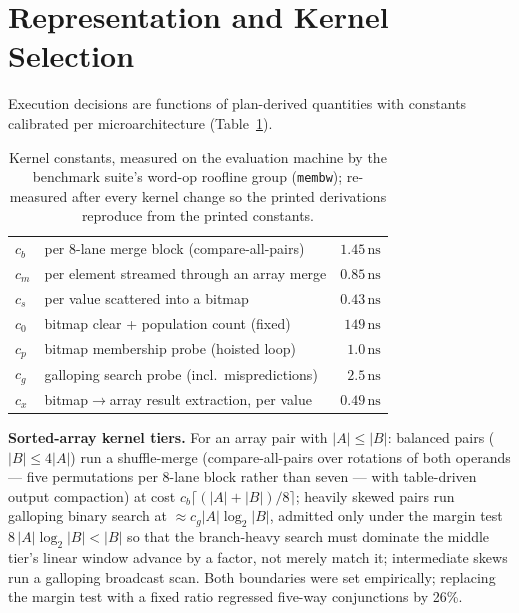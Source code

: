 \documentclass[sigconf,nonacm]{acmart}
\newcommand{\nsu}{\,\text{ns}}
\begin{document}
\section{Representation and Kernel Selection}
\label{sec:dispatch}

Execution decisions are functions of plan-derived quantities with
constants calibrated per microarchitecture (Table~\ref{tab:constants}).

\begin{table}[t]
\caption{Kernel constants, measured on the evaluation machine by the
benchmark suite's word-op roofline group (\texttt{membw}); re-measured
after every kernel change so the printed derivations reproduce from the
printed constants.}
\label{tab:constants}
\small
\begin{tabular}{llr}
\toprule
$c_b$ & per 8-lane merge block (compare-all-pairs) & $1.45\nsu$ \\
$c_m$ & per element streamed through an array merge & $0.85\nsu$ \\
$c_s$ & per value scattered into a bitmap & $0.43\nsu$ \\
$c_0$ & bitmap clear + population count (fixed) & $149\nsu$ \\
$c_p$ & bitmap membership probe (hoisted loop) & $1.0\nsu$ \\
$c_g$ & galloping search probe (incl.\ mispredictions) & $2.5\nsu$ \\
$c_x$ & bitmap$\to$array result extraction, per value & $0.49\nsu$ \\
\bottomrule
\end{tabular}
\end{table}

\textbf{Sorted-array kernel tiers.} For an array pair with
$|A| \le |B|$: balanced pairs ($|B| \le 4|A|$) run a shuffle-merge
(compare-all-pairs over rotations of both operands --- five permutations
per 8-lane block rather than seven --- with table-driven output
compaction) at cost $c_b\lceil(|A|{+}|B|)/8\rceil$; heavily skewed pairs
run galloping binary search at $\approx c_g|A|\log_2|B|$, admitted only
under the margin test $8\,|A|\log_2|B| < |B|$ so that the branch-heavy
search must dominate the middle tier's linear window advance by a
factor, not merely match it; intermediate skews run a galloping
broadcast scan. Both boundaries were set empirically; replacing the
margin test with a fixed ratio regressed five-way conjunctions by 26\%.
\end{document}
